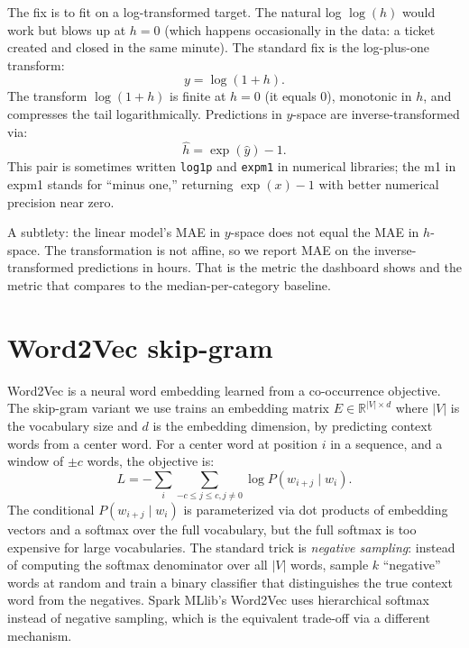 \documentclass[11pt,letterpaper]{book}
\begin{document}
The fix is to fit on a log-transformed target. The natural log $\log(h)$ would work but blows up at $h = 0$ (which happens occasionally in the data: a ticket created and closed in the same minute). The standard fix is the log-plus-one transform:
\begin{equation}
y = \log(1 + h).
\end{equation}
The transform $\log(1 + h)$ is finite at $h = 0$ (it equals 0), monotonic in $h$, and compresses the tail logarithmically. Predictions in $y$-space are inverse-transformed via:
\begin{equation}
\hat{h} = \exp(\hat{y}) - 1.
\end{equation}
This pair is sometimes written \texttt{log1p} and \texttt{expm1} in numerical libraries; the m1 in expm1 stands for ``minus one,'' returning $\exp(x) - 1$ with better numerical precision near zero.

A subtlety: the linear model's MAE in $y$-space does not equal the MAE in $h$-space. The transformation is not affine, so we report MAE on the inverse-transformed predictions in hours. That is the metric the dashboard shows and the metric that compares to the median-per-category baseline.

\section{Word2Vec skip-gram}

Word2Vec \cite{mikolov2013} is a neural word embedding learned from a co-occurrence objective. The skip-gram variant we use trains an embedding matrix $E \in \mathbb{R}^{|V| \times d}$ where $|V|$ is the vocabulary size and $d$ is the embedding dimension, by predicting context words from a center word. For a center word at position $i$ in a sequence, and a window of $\pm c$ words, the objective is:
\begin{equation}
L = -\sum_i \sum_{-c \le j \le c, j \ne 0} \log P(w_{i+j} \mid w_i).
\end{equation}
The conditional $P(w_{i+j} \mid w_i)$ is parameterized via dot products of embedding vectors and a softmax over the full vocabulary, but the full softmax is too expensive for large vocabularies. The standard trick is \emph{negative sampling}: instead of computing the softmax denominator over all $|V|$ words, sample $k$ ``negative'' words at random and train a binary classifier that distinguishes the true context word from the negatives. Spark MLlib's Word2Vec uses hierarchical softmax instead of negative sampling, which is the equivalent trade-off via a different mechanism.
\end{document}
